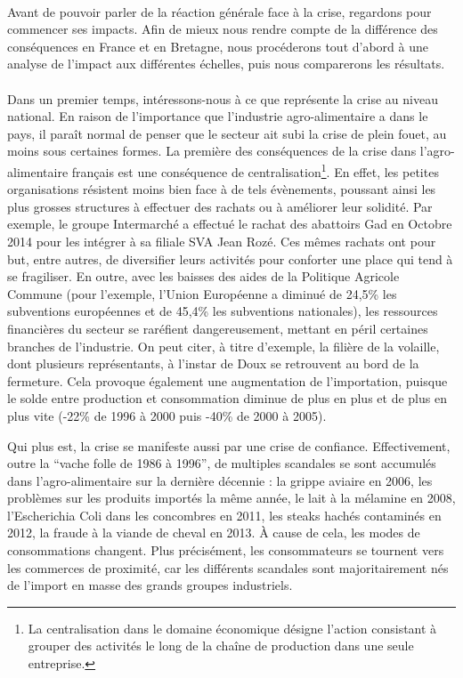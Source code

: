 \documentclass[a4paper,12pt]{report}
\begin{document}
			\paragraph{}Avant de pouvoir parler de la réaction générale face à la crise, regardons pour commencer ses impacts. Afin de mieux nous rendre compte de la différence des conséquences en France et en Bretagne, nous procéderons tout d'abord à une analyse de l'impact aux différentes échelles, puis nous comparerons les résultats.

			\paragraph{}Dans un premier temps, intéressons-nous à ce que représente la crise au niveau national. En raison de l'importance que l'industrie agro-alimentaire a dans le pays, il paraît normal de penser que le secteur ait subi la crise de plein fouet, au moins sous certaines formes. La première des conséquences de la crise dans l'agro-alimentaire français est une conséquence de centralisation\footnote{La centralisation dans le domaine économique désigne l'action consistant à grouper des activités le long de la chaîne de production dans une seule entreprise.}. En effet, les petites organisations résistent moins bien face à de tels évènements, poussant ainsi les plus grosses structures à effectuer des rachats ou à améliorer leur solidité. Par exemple, le groupe Intermarché a effectué le rachat des abattoirs Gad en Octobre 2014 pour les intégrer à sa filiale SVA Jean Rozé. Ces mêmes rachats ont pour but, entre autres, de diversifier leurs activités pour conforter une place qui tend à se fragiliser. En outre, avec les baisses des aides de la Politique Agricole Commune (pour l’exemple, l’Union Européenne a diminué de 24,5\% les subventions européennes et de 45,4\% les subventions nationales), les ressources financières du secteur se raréfient dangereusement, mettant en péril certaines branches de l’industrie. On peut citer, à titre d’exemple, la filière de la volaille, dont plusieurs représentants, à l’instar de Doux se retrouvent au bord de la fermeture. Cela provoque également une augmentation de l’importation, puisque le solde entre production et consommation diminue de plus en plus et de plus en plus vite (-22\% de 1996 à 2000 puis -40\% de 2000 à 2005)\cite{AvenirExploitationVolailleBretonne}.

			Qui plus est, la crise se manifeste aussi par une crise de confiance. Effectivement, outre la “vache folle de 1986 à 1996”, de multiples scandales se sont accumulés dans l’agro-alimentaire sur la dernière décennie\cite{Scandales} : la grippe aviaire en 2006, les problèmes sur les produits importés la même année, le lait à la mélamine en 2008, l’Escherichia Coli dans les concombres en 2011, les steaks hachés contaminés en 2012, la fraude à la viande de cheval en 2013. À cause de cela, les modes de consommations changent. Plus précisément, les consommateurs se tournent vers les commerces de proximité, car les différents scandales sont majoritairement nés de l’import en masse des grands groupes industriels.
			
\end{document}
